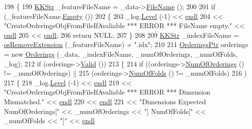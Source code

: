 \begin{DoxyCode}
198 \{
199   \hyperlink{class_k_k_b_1_1_k_k_str}{KKStr}  \_featureFileName = \_data->\hyperlink{class_k_k_m_l_l_1_1_feature_vector_list_a48c9a43f0aa93a2251a5b8d4e38c4deb}{FileName} ();
200 
201   \textcolor{keywordflow}{if}  (\_featureFileName.\hyperlink{class_k_k_b_1_1_k_k_str_ac69942f73fffd672ec2a6e1c410afdb6}{Empty} ())
202   \{
203     \_log.\hyperlink{class_k_k_b_1_1_run_log_a32cf761d7f2e747465fd80533fdbb659}{Level} (-1) << \hyperlink{namespace_k_k_b_ad1f50f65af6adc8fa9e6f62d007818a8}{endl}
204                    << \textcolor{stringliteral}{"CreateOrderingsObjFromFileIfAvaliable  *** ERROR ***  FileName empty."} << 
      \hyperlink{namespace_k_k_b_ad1f50f65af6adc8fa9e6f62d007818a8}{endl}
205                    << \hyperlink{namespace_k_k_b_ad1f50f65af6adc8fa9e6f62d007818a8}{endl};
206     \textcolor{keywordflow}{return} NULL;
207   \}
208 
209   \hyperlink{class_k_k_b_1_1_k_k_str}{KKStr} \_indexFileName = \hyperlink{namespace_k_k_b_a13b1a6f4e074969602dbe4bf9022a9c6}{osRemoveExtension} (\_featureFileName) + \textcolor{stringliteral}{".idx"};
210   
211   \hyperlink{class_k_k_m_l_l_1_1_orderings}{OrderingsPtr}  orderings = \textcolor{keyword}{new} \hyperlink{class_k_k_m_l_l_1_1_orderings_ae96f4cb54869e0e444aa9e784a97f32d}{Orderings} (\_data, \_indexFileName, \_numOfOrderings, 
      \_numOfFolds, \_log);
212   \textcolor{keywordflow}{if}  (orderings->\hyperlink{class_k_k_m_l_l_1_1_orderings_a6099411b7e4c7696d3ee63be21c8dfdd}{Valid} ())
213   \{
214     \textcolor{keywordflow}{if}  ((orderings->\hyperlink{class_k_k_m_l_l_1_1_orderings_a41d0d0beb1a993a482d3bfc91de87e54}{NumOfOrderings} () != \_numOfOrderings)  ||  
215          (orderings->\hyperlink{class_k_k_m_l_l_1_1_orderings_a4529465ab113c39b45dd76c4a7705975}{NumOfFolds}     () != \_numOfFolds)
216         )
217     \{
218       \_log.\hyperlink{class_k_k_b_1_1_run_log_a32cf761d7f2e747465fd80533fdbb659}{Level} (-1) << \hyperlink{namespace_k_k_b_ad1f50f65af6adc8fa9e6f62d007818a8}{endl}
219                      << \textcolor{stringliteral}{"CreateOrderingsObjFromFileIfAvaliable   *** ERROR ***      Dimension Mismatched."} 
      << \hyperlink{namespace_k_k_b_ad1f50f65af6adc8fa9e6f62d007818a8}{endl}
220                      << \hyperlink{namespace_k_k_b_ad1f50f65af6adc8fa9e6f62d007818a8}{endl}
221                      << \textcolor{stringliteral}{"Dimensions Expected   NumOfOrderings["} << \_numOfOrderings              << \textcolor{stringliteral}{"] 
       NumOfFolds["} << \_numOfFolds              << \textcolor{stringliteral}{"]"} << \hyperlink{namespace_k_k_b_ad1f50f65af6adc8fa9e6f62d007818a8}{endl}

\end{DoxyCode}
